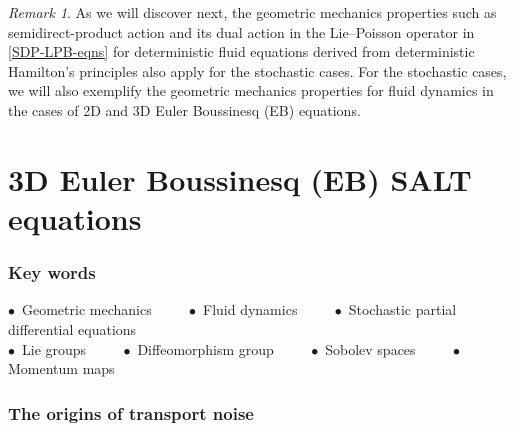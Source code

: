 \documentclass[11pt, oneside]{article}   	%
\numberwithin{equation}{section}
\theoremstyle{plain}
\theoremstyle{definition}
\theoremstyle{remark}
\newtheorem{remark}[theorem]{Remark}
\newcommand{\<}{\langle}
\renewcommand{\>}{\rangle}
\begin{document}
\begin{remark}
As we will discover next, the geometric mechanics properties such as semidirect-product action and its dual action in the Lie--Poisson operator in \eqref{SDP-LPB-eqns} for deterministic fluid equations derived from deterministic Hamilton's principles also apply for the stochastic cases. For the stochastic cases, we will also exemplify the geometric mechanics properties for fluid dynamics in the cases of 2D and 3D Euler Boussinesq (EB) equations.
\end{remark} 



\newpage
\part{3D Euler Boussinesq (EB) SALT equations}\label{EB-SALT}

\section*{Key words}
\begin{center}
$\bullet\,$ Geometric mechanics $\qquad$ $\bullet\,$ Fluid dynamics $\qquad$ $\bullet\,$ Stochastic partial differential equations\\
$\bullet\,$ Lie groups $\qquad$ $\bullet\,$ Diffeomorphism group $\qquad$ $\bullet\,$ Sobolev spaces $\qquad$ $\bullet\,$ Momentum maps
\end{center}

\section{The origins of transport noise} 
\end{document}
